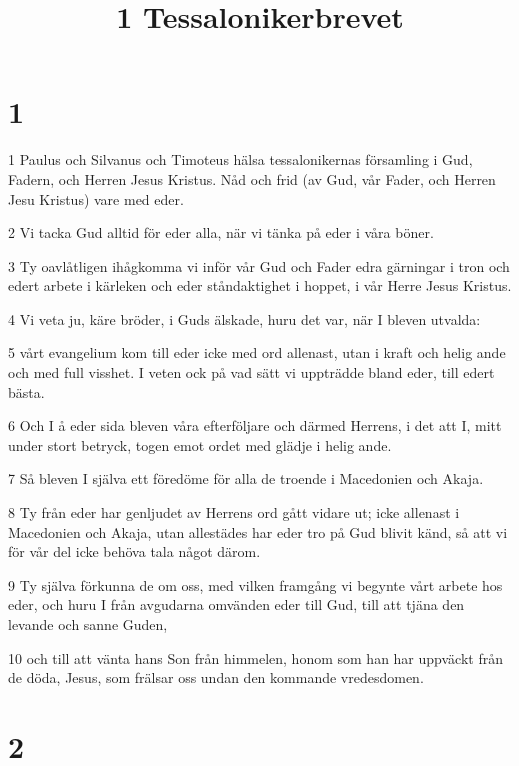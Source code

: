 

\title{1 Tessalonikerbrevet}


\chapter{1}

\par 1 Paulus och Silvanus och Timoteus hälsa tessalonikernas församling i Gud, Fadern, och Herren Jesus Kristus. Nåd och frid (av Gud, vår Fader, och Herren Jesu Kristus) vare med eder.
\par 2 Vi tacka Gud alltid för eder alla, när vi tänka på eder i våra böner.
\par 3 Ty oavlåtligen ihågkomma vi inför vår Gud och Fader edra gärningar i tron och edert arbete i kärleken och eder ståndaktighet i hoppet, i vår Herre Jesus Kristus.
\par 4 Vi veta ju, käre bröder, i Guds älskade, huru det var, när I bleven utvalda:
\par 5 vårt evangelium kom till eder icke med ord allenast, utan i kraft och helig ande och med full visshet. I veten ock på vad sätt vi uppträdde bland eder, till edert bästa.
\par 6 Och I å eder sida bleven våra efterföljare och därmed Herrens, i det att I, mitt under stort betryck, togen emot ordet med glädje i helig ande.
\par 7 Så bleven I själva ett föredöme för alla de troende i Macedonien och Akaja.
\par 8 Ty från eder har genljudet av Herrens ord gått vidare ut; icke allenast i Macedonien och Akaja, utan allestädes har eder tro på Gud blivit känd, så att vi för vår del icke behöva tala något därom.
\par 9 Ty själva förkunna de om oss, med vilken framgång vi begynte vårt arbete hos eder, och huru I från avgudarna omvänden eder till Gud, till att tjäna den levande och sanne Guden,
\par 10 och till att vänta hans Son från himmelen, honom som han har uppväckt från de döda, Jesus, som frälsar oss undan den kommande vredesdomen.

\chapter{2}

